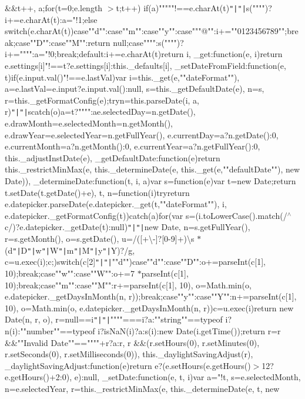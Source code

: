 \&\&t++, a\rcurly{};for(t=0;e.\+length $>$t;t++) if(a)""\textquotesingle{}"""!==e.\+char\+At(t)\texttt{"|}\texttt{"|}s(""\textquotesingle{}"")?i+=e.\+char\+At(t)\+:a="!1;else switch(e.\+char\+At(t))\lcurly{}case""d""\+:case""m""\+:case""y""\+:case"""@""\+:i+=""0123456789"";break;case""D""\+:case""M""\+:return null;case""\textquotesingle{}""\+:s(""\textquotesingle{}"")?i+=""\textquotesingle{}""\+:a="!0;break;default\+:i+=e.\+char\+At(t)\rcurly{}return i\rcurly{}, \+\_\+get\+:function(e, i)\lcurly{}return e.\+settings[i]"!==t?e.\+settings[i]\+:this.\+\_\+defaults[i]\rcurly{}, \+\_\+set\+Date\+From\+Field\+:function(e, t)\lcurly{}if(e.\+input.\+val()"!==e.\+last\+Val)\lcurly{}var i=this.\+\_\+get(e,""date\+Format""), a=e.\+last\+Val=e.\+input?e.\+input.\+val()\+:null, s=this.\+\_\+get\+Default\+Date(e), n=s, r=this.\+\_\+get\+Format\+Config(e);try\lcurly{}n=this.\+parse\+Date(i, a, r)\texttt{"|}\texttt{"|}s\rcurly{}catch(o)\lcurly{}a=t?""""\+:a\rcurly{}e.\+selected\+Day=n.\+get\+Date(), e.\+draw\+Month=e.\+selected\+Month=n.\+get\+Month(), e.\+draw\+Year=e.\+selected\+Year=n.\+get\+Full\+Year(), e.\+current\+Day=a?n.\+get\+Date()\+:0, e.\+current\+Month=a?n.\+get\+Month()\+:0, e.\+current\+Year=a?n.\+get\+Full\+Year()\+:0, this.\+\_\+adjust\+Inst\+Date(e)\rcurly{}\rcurly{}, \+\_\+get\+Default\+Date\+:function(e)\lcurly{}return this.\+\_\+restrict\+Min\+Max(e, this.\+\_\+determine\+Date(e, this.\+\_\+get(e,""default\+Date""), new Date))\rcurly{}, \+\_\+determine\+Date\+:function(t, i, a)\lcurly{}var s=function(e)\lcurly{}var t=new Date;return t.\+set\+Date(t.\+get\+Date()+e), t\rcurly{}, n=function(i)\lcurly{}try\lcurly{}return e.\+datepicker.\+parse\+Date(e.\+datepicker.\+\_\+get(t,""date\+Format""), i, e.\+datepicker.\+\_\+get\+Format\+Config(t))\rcurly{}catch(a)\lcurly{}\rcurly{}for(var s=(i.\+to\+Lower\+Case().\+match(/$^\wedge$c/)?e.\+datepicker.\+\_\+get\+Date(t)\+:null)\texttt{"|}\texttt{"|}new Date, n=s.\+get\+Full\+Year(), r=s.\+get\+Month(), o=s.\+get\+Date(), u=/([+\textbackslash{}-\/]?[0-\/9]+)\textbackslash{}s $\ast$(d\texttt{"|}D\texttt{"|}w\texttt{"|}W\texttt{"|}m\texttt{"|}M\texttt{"|}y\texttt{"|}Y)?/g, c=u.\+exec(i);c;)\lcurly{}switch(c[2]\texttt{"|}\texttt{"|}""d"")\lcurly{}case""d""\+:case""D""\+:o+=parse\+Int(c[1], 10);break;case""w""\+:case""W""\+:o+=7 $\ast$parse\+Int(c[1], 10);break;case""m""\+:case""M""\+:r+=parse\+Int(c[1], 10), o=\+Math.\+min(o, e.\+datepicker.\+\_\+get\+Days\+In\+Month(n, r));break;case""y""\+:case""Y""\+:n+=parse\+Int(c[1], 10), o=\+Math.\+min(o, e.\+datepicker.\+\_\+get\+Days\+In\+Month(n, r))\rcurly{}c=u.\+exec(i)\rcurly{}return new Date(n, r, o)\rcurly{}, r=null==i\texttt{"|}\texttt{"|}""""===i?a\+:""string""==typeof i?n(i)\+:""number""==typeof i?is\+Na\+N(i)?a\+:s(i)\+:new Date(i.\+get\+Time());return r=r \&\&""Invalid Date""==""""+r?a\+:r, r \&\&(r.\+set\+Hours(0), r.\+set\+Minutes(0), r.\+set\+Seconds(0), r.\+set\+Milliseconds(0)), this.\+\_\+daylight\+Saving\+Adjust(r)\rcurly{}, \+\_\+daylight\+Saving\+Adjust\+:function(e)\lcurly{}return e?(e.\+set\+Hours(e.\+get\+Hours()$>$12?e.\+get\+Hours()+2\+:0), e)\+:null\rcurly{}, \+\_\+set\+Date\+:function(e, t, i)\lcurly{}var a="!t, s=e.\+selected\+Month, n=e.\+selected\+Year, r=this.\+\_\+restrict\+Min\+Max(e, this.\+\_\+determine\+Date(e, t, new 